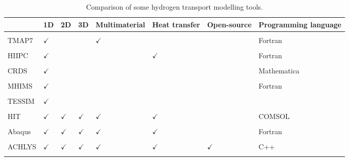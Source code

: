 \begin{table} [h]
    \centering
    \begin{tabular}{L{2cm} L{0.5cm} L{0.5cm} L{0.6cm} L{1.7cm} l l l }
        & 1D & 2D & 3D & Multimaterial & Heat transfer & Open-source & Programming language \\
        \hline \\
        TMAP7 \cite{longhurst_tmap7_2008} & $\checkmark$ & & & $\checkmark$ & & & Fortran\\
        \\
        HIIPC \cite{sang_modelling_2012} & $\checkmark$ & & & & $\checkmark$ & & Fortran\\
        \\
        CRDS \cite{matveev_reaction-diffusion_2018} & $\checkmark$ & & & & & & Mathematica \\
        \\
        MHIMS \cite{hodille_study_2016} & $\checkmark$ & & & & & & Fortran \\
        \\
        TESSIM \cite{schmid_transport_2014} & $\checkmark$ & & & & & & \\
        \\
        HIT \cite{candido_integrated_2020} & $\checkmark$ & $\checkmark$ & $\checkmark$ & $\checkmark$ & $\checkmark$ & & COMSOL\\
        \\
        Abaqus \cite{benannoune_multidimensional_2020} & $\checkmark$ & $\checkmark$ & $\checkmark$ & $\checkmark$ & $\checkmark$ & & Fortran\\
        \\
        ACHLYS \cite{stephen-dixon_aurora-multiphysicsachlys_2021} & $\checkmark$ & $\checkmark$ & $\checkmark$ & $\checkmark$ & $\checkmark$ & $\checkmark$ & C++\\
        \\
    \end{tabular}
    \caption{Comparison of some hydrogen transport modelling tools.}
    \label{tab: code comparison}
\end{table}

